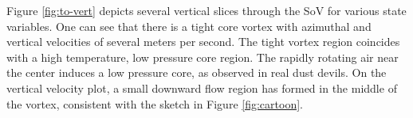 




%
%
%
Figure \ref{fig:to-vert} depicts several vertical slices through the SoV
for various state variables. One can see that there is a tight core
vortex with azimuthal and vertical velocities of several meters per
second. The tight vortex region coincides with a high temperature, low
pressure core region. The rapidly rotating air near the center induces
a low pressure core, as observed in real dust devils.
On the vertical velocity plot, a small downward flow region has formed in
the middle of the vortex, consistent with the sketch in Figure
\ref{fig:cartoon}.  


